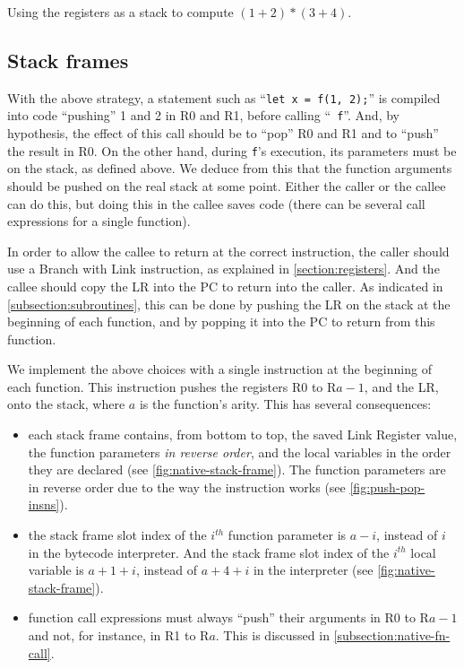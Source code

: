 \begin{Figure}
  

  \caption{Using the registers as a stack to compute
  $(1+2)*(3+4)$.}\label{fig:register-stack}
\end{Figure}

\subsection{Stack frames}\label{subsection:native-stack-frames}

With the above strategy, a statement such as ``{\tt let x = f(1, 2);}'' is
compiled into code ``pushing'' 1 and 2 in R0 and R1, before calling ``{\tt
f}''. And, by hypothesis, the effect of this call should be to ``pop'' R0 and
R1 and to ``push'' the result in R0. On the other hand, during {\tt f}'s
execution, its parameters must be on the stack, as defined above. We deduce
from this that the function arguments should be pushed on the real stack at
some point. Either the caller or the callee can do this, but doing this in the
callee saves code (there can be several call expressions for a single function).

In order to allow the callee to return at the correct instruction, the caller
should use a Branch with Link instruction, as explained in
\cref{section:registers}. And the callee should copy the LR into the PC to
return into the caller. As indicated in \cref{subsection:subroutines}, this can
be done by pushing the LR on the stack at the beginning of each function, and
by popping it into the PC to return from this function.

We implement the above choices with a single  instruction at the
beginning of each function. This instruction pushes the registers R0 to R$a-1$,
and the LR, onto the stack, where $a$ is the function's arity. This has several
consequences:
\begin{itemize}
  \item each stack frame contains, from bottom to top, the saved Link Register
  value, the function parameters {\em in reverse order}, and the local
  variables in the order they are declared (see \cref{fig:native-stack-frame}).
  The function parameters are in reverse order due to the way the 
  instruction works (see \cref{fig:push-pop-insns}).

  \item the stack frame slot index of the $i^{th}$ function parameter is $a-i$,
  instead of $i$ in the bytecode interpreter. And the stack frame slot index of
  the $i^{th}$ local variable is $a+1+i$, instead of $a+4+i$ in the interpreter
  (see \cref{fig:native-stack-frame}).

  \item function call expressions must always ``push'' their arguments in R0 to
  R$a-1$ and not, for instance, in R1 to R$a$. This is discussed in
  \cref{subsection:native-fn-call}.
\end{itemize}

